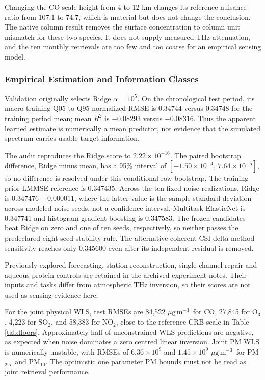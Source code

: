 \documentclass[conference]{IEEEtran}
\newcommand{\ugm}{\ensuremath{\mu\mathrm{g\,m}^{-3}}}
\newcommand{\pmfive}{PM$_{2.5}$}
\newcommand{\pmten}{PM$_{10}$}
\begin{document}
Changing the CO scale height from 4 to 12 km changes its reference nuisance ratio from 107.1 to 74.7, which is material but does not change the conclusion. The native column result removes the surface concentration to column unit mismatch for these two species. It does not supply measured THz attenuation, and the ten monthly retrievals are too few and too coarse for an empirical sensing model.

\subsubsection{Empirical Estimation and Information Classes}

Validation originally selects Ridge $\alpha=10^5$. On the chronological test period, its macro training Q05 to Q95 normalized RMSE is 0.34744 versus 0.34748 for the training period mean; mean $R^2$ is $-0.08293$ versus $-0.08316$. Thus the apparent learned estimate is numerically a mean predictor, not evidence that the simulated spectrum carries usable target information.

The audit reproduces the Ridge score to $2.22\times10^{-16}$. The paired bootstrap difference, Ridge minus mean, has a 95\% interval of $[-1.50\times10^{-4},\,7.64\times10^{-5}]$, so no difference is resolved under this conditional row bootstrap. The training prior LMMSE reference is 0.347435. Across the ten fixed noise realizations, Ridge is $0.347476\pm0.000011$, where the latter value is the sample standard deviation across modeled noise seeds, not a confidence interval. Multitask ElasticNet is 0.347741 and histogram gradient boosting is 0.347583. The frozen candidates beat Ridge on zero and one of ten seeds, respectively, so neither passes the predeclared eight seed stability rule. The alternative coherent CSI delta method sensitivity reaches only 0.345600 even after its independent residual is removed.

Previously explored forecasting, station reconstruction, single-channel repair and aqueous-protein controls are retained in the archived experiment notes. Their inputs and tasks differ from atmospheric THz inversion, so their scores are not used as sensing evidence here.

For the joint physical WLS, test RMSEs are 84,522 \ugm\ for CO, 27,845 for O$_3$, 4,223 for SO$_2$, and 58,383 for NO$_2$, close to the reference CRB scale in Table \ref{tab:floors}. Approximately half of unconstrained WLS predictions are negative, as expected when noise dominates a zero centred linear inversion. Joint PM WLS is numerically unstable, with RMSEs of $6.36\times10^9$ and $1.45\times10^9$ \ugm\ for \pmfive\ and \pmten. The optimistic one parameter PM bounds must not be read as joint retrieval performance.
\end{document}
